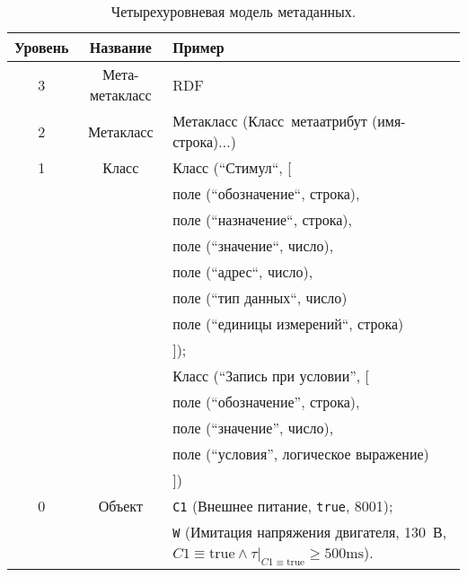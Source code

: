 \begin{longtable}{|c|c|p{}|}
    \caption{Четырехуровневая модель метаданных.}\label{tbl:meta_data_levels} \\
    \hline\textbf{Уровень} & \textbf{Название} & \textbf{Пример} \\\hline\endhead
    3 & Мета-метакласс & RDF \\\hline
    2 & Метакласс & Метакласс (Класс~метаатрибут (имя-строка)...) \\\hline
    1 & Класс & Класс (``Стимул``, [\\
                &&\hspace{5mm}поле (``обозначение``, строка), \\
                &&\hspace{5mm}поле (``назначение``, строка), \\
                &&\hspace{5mm}поле (``значение``, число),\\
                &&\hspace{5mm}поле (``адрес``, число),\\
                &&\hspace{5mm}поле (``тип данных``, число)\\
                &&\hspace{5mm}поле (``единицы измерений``, строка)\\
            &&]);\\
            &&Класс (``Запись при условии'', [\\
                &&\hspace{5mm}поле (``обозначение'', строка),\\
                &&\hspace{5mm}поле (``значение'', число),\\
                &&\hspace{5mm}поле (``условия'', логическое выражение)\\
            &&])\\\hline
    0 & Объект & 
        \texttt{C1} (Внешнее питание, \texttt{true}, 8001); \\
        &&\texttt{W} (Имитация напряжения двигателя, 130~В, $C1 \equiv \mbox{true} \wedge \tau|_{C1\equiv\mbox{true}} \ge 500\mbox{ms}$).
        \\\hline
\end{longtable}


